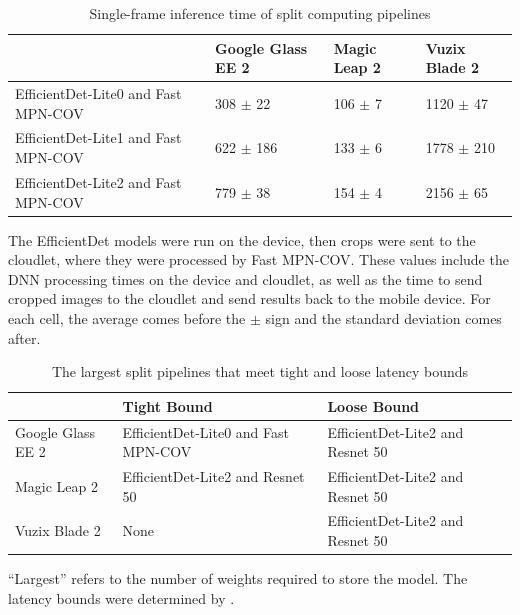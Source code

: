 \begin{table}
\begin{tabular}{|l||l|l|l|}
  \hline
  & Google Glass EE 2 & Magic Leap 2 & Vuzix Blade 2\\
  \hline
  \hline
  EfficientDet-Lite0 and Fast MPN-COV & 308 $\pm$ 22 & 106 $\pm$ 7 & 1120 $\pm$ 47\\
  EfficientDet-Lite1 and Fast MPN-COV & 622 $\pm$ 186 & 133 $\pm$ 6 & 1778 $\pm$ 210\\
  EfficientDet-Lite2 and Fast MPN-COV & 779 $\pm$ 38 & 154 $\pm$ 4 & 2156 $\pm$ 65\\
  \hline
\end{tabular}
\begin{captiontext}
  The EfficientDet models were run on the device, then crops were sent to the
  cloudlet, where they were processed by Fast MPN-COV.
  These values include the DNN processing times on the device and cloudlet, as
  well as the time to send cropped images to the cloudlet and send results
  back to the mobile device.
  For each cell, the average comes before the $\pm$ sign and the standard
  deviation comes after.
\end{captiontext}
  \caption{
    Single-frame inference time of split computing pipelines
  }\label{tab:split_time}
\end{table}

\begin{table}
\begin{tabular}{|l||l|l|l|}
  \hline
  & Tight Bound & Loose Bound\\
  \hline
  \hline
  Google Glass EE 2 & EfficientDet-Lite0 and Fast MPN-COV & EfficientDet-Lite2 and Resnet 50\\
  Magic Leap 2 & EfficientDet-Lite2 and Resnet 50 & EfficientDet-Lite2 and Resnet 50\\
  Vuzix Blade 2 & None & EfficientDet-Lite2 and Resnet 50\\
  \hline
\end{tabular}
\begin{captiontext}
  ``Largest'' refers to the number of weights required to store the model.
  The latency bounds were determined by \citet{chen2017}.
  \end{captiontext}
  \caption{
    The largest split pipelines that meet tight and loose latency bounds
  }\label{tab:split_latency_bound}
\end{table}

